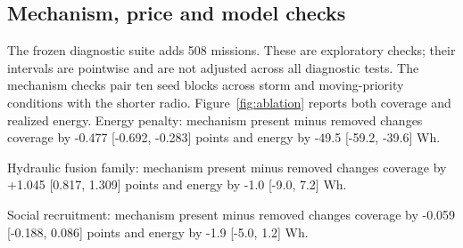 \subsection{Mechanism, price and model checks}
The frozen diagnostic suite adds 508 missions. These are exploratory checks;
their intervals are pointwise and are not adjusted across all diagnostic tests.
The mechanism checks pair ten seed blocks across storm and moving-priority
conditions with the shorter radio. Figure~\ref{fig:ablation} reports both
coverage and realized energy.
Energy penalty: mechanism present minus removed changes coverage by -0.477 [-0.692, -0.283] points and energy by -49.5 [-59.2, -39.6] Wh.

Hydraulic fusion family: mechanism present minus removed changes coverage by +1.045 [0.817, 1.309] points and energy by -1.0 [-9.0, 7.2] Wh.

Social recruitment: mechanism present minus removed changes coverage by -0.059 [-0.188, 0.086] points and energy by -1.9 [-5.0, 1.2] Wh.


